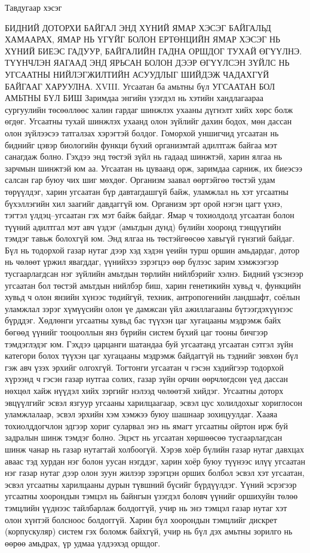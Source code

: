 Тавдугаар хэсэг

БИДНИЙ ДОТОРХИ БАЙГАЛ
ЭНД ХҮНИЙ ЯМАР ХЭСЭГ БАЙГАЛЬД ХАМААРАХ, ЯМАР НЬ ҮГҮЙГ БОЛОН ЕРТӨНЦИЙН ЯМАР ХЭСЭГ НЬ ХҮНИЙ БИЕЭС ГАДУУР, БАЙГАЛИЙН ГАДНА ОРШДОГ ТУХАЙ ӨГҮҮЛНЭ. ТҮҮНЧЛЭН ЯАГААД ЭНД ЯРЬСАН БОЛОН ДЭЭР ӨГҮҮЛСЭН ЗҮЙЛС НЬ УГСААТНЫ НИЙЛЭГЖИЛТИЙН АСУУДЛЫГ ШИЙДЭЖ ЧАДАХГҮЙ БАЙГААГ ХАРУУЛНА.
XVIII. Угсаатан ба амьтны бүл
УГСААТАН БОЛ АМЬТНЫ БҮЛ БИШ
Заримдаа энгийн үзэгдэл нь хэтийн хандлагаараа сургуулийн төсөөллөөс халин гардаг шинжлэх ухааны дүгнэлт хийх хөрс болж өгдөг. Угсаатны тухай шинжлэх ухаанд олон зүйлийг дахин бодох, мөн дассан олон зүйлээсээ татгалзах хэрэгтэй болдог.
Гоморхой уншигчид угсаатан нь биднийг цэвэр биологийн функци бүхий организмтай адилтгаж байгаа мэт санагдаж болно. Гэхдээ энд төстэй зүйл нь гадаад шинжтэй, харин ялгаа нь зарчмын шинжтэй юм аа. Угсаатан нь цуваанд орж, заримдаа сарниж, их биеэсээ салсан гар буюу чих шиг мөхдөг. Организм заавал өөртэйгөө төстэй удам төрүүлдэг, харин угсаатан бүр давтагдашгүй байж, уламжлал нь хэт угсаатны бүхэллэгийн хил заагийг давдаггүй юм. Организм эрт орой нэгэн цагт үхнэ, тэгтэл үлдэц–угсаатан гэх мэт байж байдаг.
Ямар ч тохиолдолд угсаатан болон түүний адилтгал мэт авч үздэг (амьтдын дунд) бүлийн хооронд тэнцүүгийн тэмдэг тавьж болохгүй юм. Энд ялгаа нь төстэйгөөсөө хавьгүй гүнзгий байдаг. Бүл нь тодорхой газар нутаг дээр хэд хэдэн үеийн турш оршин амьдардаг, дотор нь чөлөөт үржил явагддаг, үүнийхээ зэрэгцээ өөр бүлээс зарим хэмжээгээр тусгаарлагдсан нэг зүйлийн амьтдын төрлийн нийлбэрийг хэлнэ. Бидний үзсэнээр угсаатан бол төстэй амьтдын нийлбэр биш, харин генетикийн хувьд ч, функцийн хувьд ч олон янзийн хүнээс төдийгүй, техник, антропогенийн ландшафт, соёлын уламжлал зэрэг хүмүүсийн олон үе дамжсан үйл ажиллагааны бүтээгдэхүүнээс бүрддэг. Хөдлөнги угсаатны хувьд бас түүхэн цаг хугацааны мэдрэмж байх бөгөөд үүнийг тооцооллын янз бүрийн систем бүхий цаг тооны бичгээр тэмдэглэдэг юм.
Гэхдээ царцанги шатандаа буй угсаатанд угсаатан сэтгэл зүйн категори болох түүхэн цаг хугацааны мэдрэмж байдаггүй нь тэднийг зөвхөн бүл гэж авч үзэх эрхийг олгохгүй. Тогтонги угсаатан ч гэсэн хэдийгээр тодорхой хүрээнд ч гэсэн газар нутгаа солих, газар зүйн орчин өөрчлөгдсөн үед дассан нөхцөл хайж нүүдэл хийх зэргийг нэлээд чөлөөтэй хийдэг. Угсаатны доторх эвцүүлгийг эсвэл язгуур угсааны харилцаагаар, эсвэл цус холилдохыг хориглосон уламжлалаар, эсвэл эрхийн хэм хэмжээ буюу шашнаар зохицуулдаг. Хааяа тохиолддогчлон эдгээр хориг суларвал энэ нь ямагт угсаатны ойртон ирж буй задралын шинж тэмдэг болно.
Эцэст нь угсаатан хөршөөсөө тусгаарлагдсан шинж чанар нь газар нутагтай холбоогүй. Хэрэв хоёр бүлийн газар нутаг давхцах аваас тэд хурдан нэг болон уусан нэгддэг, харин хоёр буюу түүнээс илүү угсаатан нэг газар нутаг дээр олон зуун жилээр зэрэгцэн орших болбол эсвэл хэт угсаатан, эсвэл угсаатны харилцааны дурын түвшний бүсийг бүрдүүлдэг. Үүний эсрэгээр угсаатны хоорондын тэмцэл нь байнгын үзэгдэл боловч үүнийг оршихуйн төлөө тэмцлийн үүднээс тайлбарлаж болдоггүй, учир нь энэ тэмцэл газар нутаг хэт олон хүнтэй болсноос болдоггүй. Харин бүл хоорондын тэмцлийг дискрет (корпускуляр) систем гэх боломж байхгүй, учир нь бүл дэх амьтны зорилго нь өөрөө амьдрах, үр удмаа үлдээхэд оршдог.
